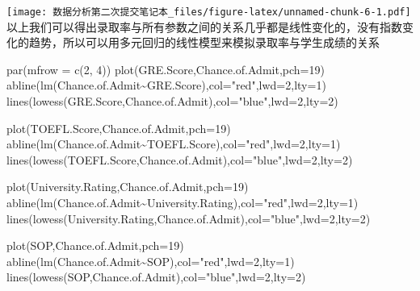 \documentclass[
]{article}
\newenvironment{Shaded}{\begin{snugshade}}{\end{snugshade}}
\newcommand{\AttributeTok}[1]{\textcolor[rgb]{0.77,0.63,0.00}{#1}}
\newcommand{\DecValTok}[1]{\textcolor[rgb]{0.00,0.00,0.81}{#1}}
\newcommand{\FunctionTok}[1]{\textcolor[rgb]{0.00,0.00,0.00}{#1}}
\newcommand{\NormalTok}[1]{#1}
\newcommand{\SpecialCharTok}[1]{\textcolor[rgb]{0.00,0.00,0.00}{#1}}
\newcommand{\StringTok}[1]{\textcolor[rgb]{0.31,0.60,0.02}{#1}}
\begin{document}
\texttt{[image: 数据分析第二次提交笔记本\_files/figure-latex/unnamed-chunk-6-1.pdf]}
以上我们可以得出录取率与所有参数之间的关系几乎都是线性变化的，没有指数变化的趋势，所以可以用多元回归的线性模型来模拟录取率与学生成绩的关系

\begin{Shaded}
\begin{Highlighting}[]
\FunctionTok{par}\NormalTok{(}\AttributeTok{mfrow =} \FunctionTok{c}\NormalTok{(}\DecValTok{2}\NormalTok{, }\DecValTok{4}\NormalTok{))}
\FunctionTok{plot}\NormalTok{(GRE.Score,Chance.of.Admit,}\AttributeTok{pch=}\DecValTok{19}\NormalTok{)}
\FunctionTok{abline}\NormalTok{(}\FunctionTok{lm}\NormalTok{(Chance.of.Admit}\SpecialCharTok{\textasciitilde{}}\NormalTok{GRE.Score),}\AttributeTok{col=}\StringTok{"red"}\NormalTok{,}\AttributeTok{lwd=}\DecValTok{2}\NormalTok{,}\AttributeTok{lty=}\DecValTok{1}\NormalTok{)}
\FunctionTok{lines}\NormalTok{(}\FunctionTok{lowess}\NormalTok{(GRE.Score,Chance.of.Admit),}\AttributeTok{col=}\StringTok{"blue"}\NormalTok{,}\AttributeTok{lwd=}\DecValTok{2}\NormalTok{,}\AttributeTok{lty=}\DecValTok{2}\NormalTok{)}

\FunctionTok{plot}\NormalTok{(TOEFL.Score,Chance.of.Admit,}\AttributeTok{pch=}\DecValTok{19}\NormalTok{)}
\FunctionTok{abline}\NormalTok{(}\FunctionTok{lm}\NormalTok{(Chance.of.Admit}\SpecialCharTok{\textasciitilde{}}\NormalTok{TOEFL.Score),}\AttributeTok{col=}\StringTok{"red"}\NormalTok{,}\AttributeTok{lwd=}\DecValTok{2}\NormalTok{,}\AttributeTok{lty=}\DecValTok{1}\NormalTok{)}
\FunctionTok{lines}\NormalTok{(}\FunctionTok{lowess}\NormalTok{(TOEFL.Score,Chance.of.Admit),}\AttributeTok{col=}\StringTok{"blue"}\NormalTok{,}\AttributeTok{lwd=}\DecValTok{2}\NormalTok{,}\AttributeTok{lty=}\DecValTok{2}\NormalTok{)}

\FunctionTok{plot}\NormalTok{(University.Rating,Chance.of.Admit,}\AttributeTok{pch=}\DecValTok{19}\NormalTok{)}
\FunctionTok{abline}\NormalTok{(}\FunctionTok{lm}\NormalTok{(Chance.of.Admit}\SpecialCharTok{\textasciitilde{}}\NormalTok{University.Rating),}\AttributeTok{col=}\StringTok{"red"}\NormalTok{,}\AttributeTok{lwd=}\DecValTok{2}\NormalTok{,}\AttributeTok{lty=}\DecValTok{1}\NormalTok{)}
\FunctionTok{lines}\NormalTok{(}\FunctionTok{lowess}\NormalTok{(University.Rating,Chance.of.Admit),}\AttributeTok{col=}\StringTok{"blue"}\NormalTok{,}\AttributeTok{lwd=}\DecValTok{2}\NormalTok{,}\AttributeTok{lty=}\DecValTok{2}\NormalTok{)}

\FunctionTok{plot}\NormalTok{(SOP,Chance.of.Admit,}\AttributeTok{pch=}\DecValTok{19}\NormalTok{)}
\FunctionTok{abline}\NormalTok{(}\FunctionTok{lm}\NormalTok{(Chance.of.Admit}\SpecialCharTok{\textasciitilde{}}\NormalTok{SOP),}\AttributeTok{col=}\StringTok{"red"}\NormalTok{,}\AttributeTok{lwd=}\DecValTok{2}\NormalTok{,}\AttributeTok{lty=}\DecValTok{1}\NormalTok{)}
\FunctionTok{lines}\NormalTok{(}\FunctionTok{lowess}\NormalTok{(SOP,Chance.of.Admit),}\AttributeTok{col=}\StringTok{"blue"}\NormalTok{,}\AttributeTok{lwd=}\DecValTok{2}\NormalTok{,}\AttributeTok{lty=}\DecValTok{2}\NormalTok{)}


\end{Highlighting}
\end{Shaded}
\end{document}
